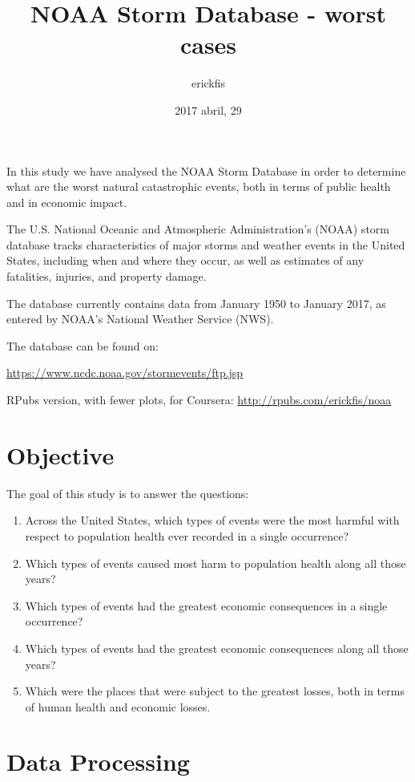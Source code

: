 \documentclass[]{article}
\title{NOAA Storm Database - worst cases}
\author{erickfis}
\date{2017 abril, 29}
\begin{document}
\maketitle

{
\setcounter{tocdepth}{3}
\tableofcontents
}
In this study we have analysed the NOAA Storm Database in order to
determine what are the worst natural catastrophic events, both in terms
of public health and in economic impact.

The U.S. National Oceanic and Atmospheric Administration's (NOAA) storm
database tracks characteristics of major storms and weather events in
the United States, including when and where they occur, as well as
estimates of any fatalities, injuries, and property damage.

The database currently contains data from January 1950 to January 2017,
as entered by NOAA's National Weather Service (NWS).

The database can be found on:

\url{https://www.ncdc.noaa.gov/stormevents/ftp.jsp}

RPubs version, with fewer plots, for Coursera:
\url{http://rpubs.com/erickfis/noaa}

\section{Objective}\label{objective}

The goal of this study is to answer the questions:

\begin{enumerate}
\def\labelenumi{\arabic{enumi}.}
\item
  Across the United States, which types of events were the most harmful
  with respect to population health ever recorded in a single
  occurrence?
\item
  Which types of events caused most harm to population health along all
  those years?
\item
  Which types of events had the greatest economic consequences in a
  single occurrence?
\item
  Which types of events had the greatest economic consequences along all
  those years?
\item
  Which were the places that were subject to the greatest losses, both
  in terms of human health and economic losses.
\end{enumerate}

\section{Data Processing}\label{data-processing}
\end{document}

